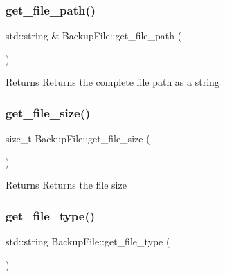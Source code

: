 \subsubsection{\texorpdfstring{get\+\_\+file\+\_\+path()}{get\_file\_path()}\hspace{0.1cm}{\footnotesize\ttfamily [2/2]}}
{\footnotesize\ttfamily std\+::string \& Backup\+File\+::get\+\_\+file\+\_\+path (\begin{DoxyParamCaption}{ }\end{DoxyParamCaption})}

\begin{DoxyReturn}{Returns}
Returns the complete file path as a string 
\end{DoxyReturn}
\mbox{\label{class_backup_1_1_file_1_1_backup_file_a482909cefc3cf777657a2500a7fd8c47}} 
\subsubsection{\texorpdfstring{get\+\_\+file\+\_\+size()}{get\_file\_size()}}
{\footnotesize\ttfamily size\+\_\+t Backup\+File\+::get\+\_\+file\+\_\+size (\begin{DoxyParamCaption}{ }\end{DoxyParamCaption})}

\begin{DoxyReturn}{Returns}
Returns the file size 
\end{DoxyReturn}
\mbox{\label{class_backup_1_1_file_1_1_backup_file_abc2a8b1743ceb5b1ce8a7a9ce7967804}} 
\subsubsection{\texorpdfstring{get\+\_\+file\+\_\+type()}{get\_file\_type()}}
{\footnotesize\ttfamily std\+::string Backup\+File\+::get\+\_\+file\+\_\+type (\begin{DoxyParamCaption}{ }\end{DoxyParamCaption})}

